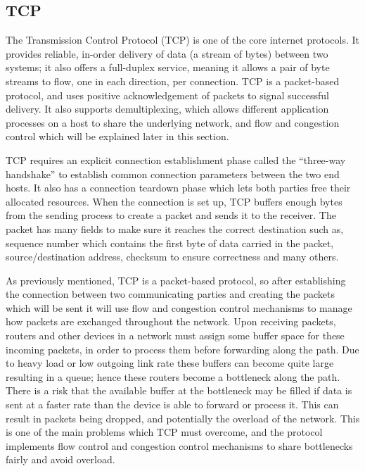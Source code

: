 \subsection{TCP}
The Transmission Control Protocol (TCP) is one of the core internet protocols.
It provides reliable, in-order delivery of data (a stream of bytes) between two
systems; it also offers a full-duplex service, meaning it allows a pair of byte
streams to flow, one in each direction, per connection. TCP is a packet-based
protocol, and uses positive acknowledgement of packets to signal successful
delivery. It also supports demultiplexing, which allows different application
processes on a host to share the underlying network, and flow and congestion
control which will be explained later in this section.


TCP requires an explicit connection establishment phase called the ``three-way
handshake'' to establish common connection parameters between the two end hosts.
It also has a connection teardown phase which lets both parties free their
allocated resources. When the connection is set up, TCP buffers enough bytes
from the sending process to create a packet and sends it to the receiver. The
packet has many fields to make sure it reaches the correct destination such as,
sequence number which contains the first byte of data carried in the packet,
source/destination address, checksum to ensure correctness and many others.

As previously mentioned, TCP is a packet-based protocol, so after establishing
the connection between two communicating parties and creating the packets which
will be sent it will use flow and congestion control mechanisms to manage how
packets are exchanged throughout the network. Upon receiving packets, routers
and other devices in a network must assign some buffer space for these incoming
packets, in order to process them before forwarding along the path. Due to heavy
load or low outgoing link rate these buffers can become quite large resulting in
a queue; hence these routers become a bottleneck along the path. There is a risk
that the available buffer at the bottleneck may be filled if data is sent at a
faster rate than the device is able to forward or process it. This can result in
packets being dropped, and potentially the overload of the network. This is one
of the main problems which TCP must overcome, and the protocol implements flow
control and congestion control mechanisms to share bottlenecks fairly and avoid
overload.

